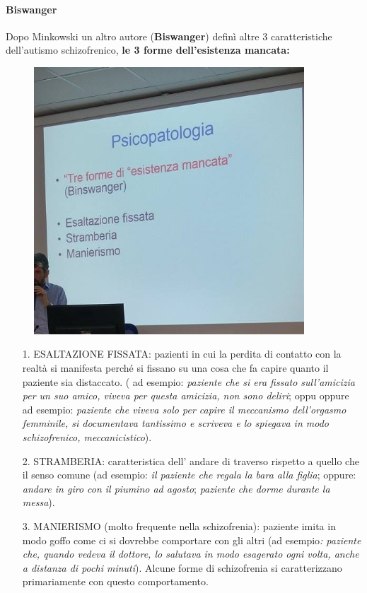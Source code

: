 \paragraph{Biswanger}

Dopo Minkowski un altro autore (\textbf{Biswanger}) definì altre 3
caratteristiche dell'autismo schizofrenico, \textbf{le 3 forme
dell'esistenza mancata:}

\begin{figure}[!ht]
\centering
	\includegraphics[width=0.9\textwidth]{06/image5.jpeg}
\end{figure}

\begin{itemize}
\item[1.]
  ESALTAZIONE FISSATA: pazienti in cui la perdita di contatto con la
  realtà si manifesta perché si fissano su una cosa che fa capire quanto
  il paziente sia distaccato. ( ad esempio: \emph{paziente che si era
  fissato sull'amicizia per un suo amico, viveva per questa amicizia,
  non sono deliri}; oppu oppure ad esempio: \emph{paziente che viveva
  solo per capire il meccanismo dell'orgasmo femminile, si documentava
  tantissimo e scriveva e lo spiegava in modo schizofrenico,
  meccanicistico}).
\item[2.]
  STRAMBERIA: caratteristica dell' andare di traverso rispetto a quello
  che il senso comune (ad esempio: \emph{il paziente che regala la bara
  alla figlia}; oppure: \emph{andare in giro con il piumino ad agosto};
  \emph{paziente che dorme durante la messa}).
\item[3.]
  MANIERISMO (molto frequente nella schizofrenia): paziente imita in
  modo goffo come ci si dovrebbe comportare con gli altri (ad
  esempio\emph{: paziente che, quando vedeva il dottore, lo salutava in
  modo esagerato ogni volta, anche a distanza di pochi minuti}). Alcune
  forme di schizofrenia si caratterizzano primariamente con questo
  comportamento.
\end{itemize}

